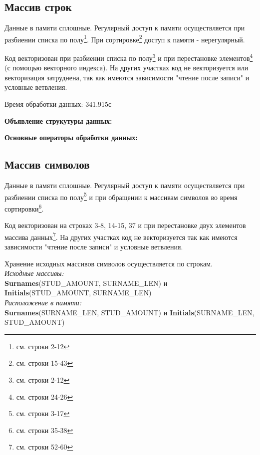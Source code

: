 \documentclass[a4paper, 12pt] {article}
\begin{document}
\subsection{Массив строк}

  Данные в памяти сплошные. Регулярный доступ к памяти осуществляется при разбиении списка по
полу\footnote{см. строки 2-12}. При сортировке\footnote{см. строки
15-43} доступ к памяти - нерегулярный.
  
  Код векторизован при разбиении списка по полу\footnote{см. строки
  2-12} и при перестановке элементов\footnote{см. строки 24-26} (с помощью векторного индекса).
На других участках код не векторизуется или векторизация затруднена, так как имеются зависимости
"чтение после записи" и условные ветвления.

  Время обработки данных: 341.915с\bigskip

{\bfseries{\large Объявление струкутуры данных:}}
 

\newpage
{\bfseries{\large Основные операторы обработки данных:}}
 

\newpage
\subsection{Массив символов}

  Данные в памяти сплошные. Регулярный доступ к памяти осуществляется
при разбиении списка по полу\footnote{см. строки 3-17} и при
обращении к массивам символов во время сортировки\footnote{см. строки 35-38}.

  Код векторизован на строках 3-8, 14-15, 37 и при перестановке двух
элементов массива данных\footnote{см. строки 52-60}. На других
участках код не векторизуется так как имеются зависимости
"чтение после записи" и условные ветвления.\bigskip

  Хранение исходных массивов символов осуществляется по строкам.\\
\textit{Исходные массивы:}\\
\textbf{Surnames}(STUD\_AMOUNT, SURNAME\_LEN) и \textbf{Initials}(STUD\_AMOUNT, SURNAME\_LEN)\\
\textit{Расположение в памяти:}\\
\textbf{Surnames}(SURNAME\_LEN, STUD\_AMOUNT) и \textbf{Initials}(SURNAME\_LEN, STUD\_AMOUNT)\smallskip
\end{document}
